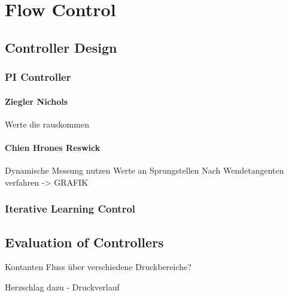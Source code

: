 \chapter{Flow Control}
\section{Controller Design}
\subsection{PI Controller}
\subsubsection{Ziegler Nichols}
Werte die rauskommen

\subsubsection{Chien Hrones Reswick}
Dynamische Messung nutzen
Werte an Sprungstellen
Nach Wendetangenten verfahren -> GRAFIK

\subsection{Iterative Learning Control}

\section{Evaluation of Controllers}
Kontanten Fluss über verschiedene Druckbereiche?


Herzschlag dazu - Druckverlauf
